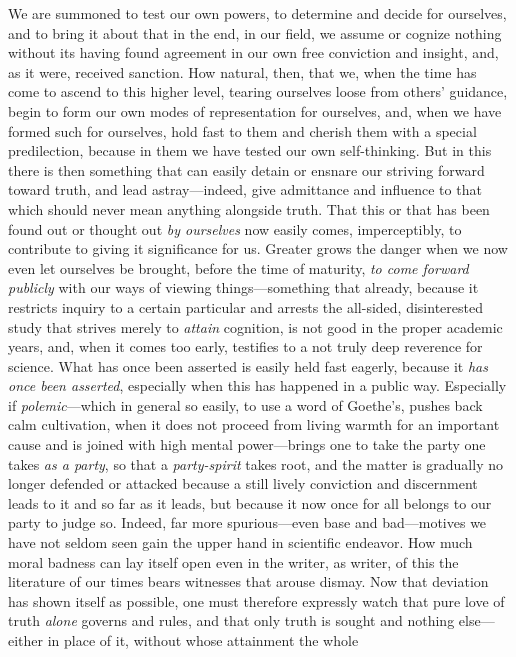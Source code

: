 \documentclass[12pt,a4paper]{book}
\begin{document}
We are summoned to test our own powers, to determine and decide for ourselves, and to bring it
about that in the end, in our field, we assume or cognize nothing without its having found
agreement in our own free conviction and insight, and, as it were, received sanction. How natural,
then, that we, when the time has come to ascend to this higher level, tearing ourselves loose from
others' guidance, begin to form our own modes of representation for ourselves, and, when we have
formed such for ourselves, hold fast to them and cherish them with a special predilection, because
in them we have tested our own self-thinking. But in this there is then something that can easily
detain or ensnare our striving forward toward truth, and lead astray---indeed, give admittance and
influence to that which should never mean anything alongside truth. That this or that has been
found out or thought out \emph{by ourselves} now easily comes, imperceptibly, to contribute to
giving it significance for us. Greater grows the danger when we now even let ourselves be brought,
before the time of maturity, \emph{to come forward publicly} with our ways of viewing things---something
that already, because it restricts inquiry to a certain particular and arrests the all-sided,
disinterested study that strives merely to \emph{attain} cognition, is not good in the proper academic
years, and, when it comes too early, testifies to a not truly deep reverence for science. What has
once been asserted is easily held fast eagerly, because it \emph{has once been asserted}, especially
when this has happened in a public way. Especially if \emph{polemic}---which in general so easily, to use a
word of Goethe's, pushes back calm cultivation, when it does not proceed from living warmth for an
important cause and is joined with high mental power---brings one to take the party one takes \emph{as a
party}, so that a \emph{party-spirit} takes root, and the matter is gradually no longer
defended or attacked because a still lively conviction and discernment leads to it and so far as it
leads, but because it now once for all belongs to our party to judge so. Indeed, far more spurious---even
base and bad---motives we have not seldom seen gain the upper hand in scientific endeavor. How much
moral badness can lay itself open even in the writer, as writer, of this the literature of our times
bears witnesses that arouse dismay. Now that deviation has shown itself as possible, one must
therefore expressly watch that pure love of truth \emph{alone} governs and rules, and that only
truth is sought and nothing else---either in place of it, without whose attainment the whole
\end{document}
